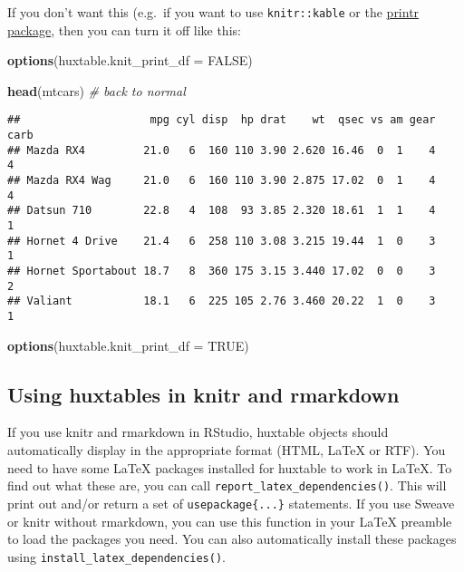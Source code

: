 \documentclass[]{article}
\newenvironment{Shaded}{\begin{snugshade}}{\end{snugshade}}
\newcommand{\CommentTok}[1]{\textcolor[rgb]{0.56,0.35,0.01}{\textit{#1}}}
\newcommand{\DataTypeTok}[1]{\textcolor[rgb]{0.13,0.29,0.53}{#1}}
\newcommand{\KeywordTok}[1]{\textcolor[rgb]{0.13,0.29,0.53}{\textbf{#1}}}
\newcommand{\NormalTok}[1]{#1}
\newcommand{\OtherTok}[1]{\textcolor[rgb]{0.56,0.35,0.01}{#1}}
\begin{document}
\FloatBarrier

If you don't want this (e.g.~if you want to use \texttt{knitr::kable} or
the
\href{https://cran.r-project.org/package=printr/vignettes/printr.html}{printr
package}, then you can turn it off like this:

\begin{Shaded}
\begin{Highlighting}[]
\KeywordTok{options}\NormalTok{(}\DataTypeTok{huxtable.knit_print_df =} \OtherTok{FALSE}\NormalTok{)}

\KeywordTok{head}\NormalTok{(mtcars) }\CommentTok{# back to normal}
\end{Highlighting}
\end{Shaded}

\begin{verbatim}
##                    mpg cyl disp  hp drat    wt  qsec vs am gear carb
## Mazda RX4         21.0   6  160 110 3.90 2.620 16.46  0  1    4    4
## Mazda RX4 Wag     21.0   6  160 110 3.90 2.875 17.02  0  1    4    4
## Datsun 710        22.8   4  108  93 3.85 2.320 18.61  1  1    4    1
## Hornet 4 Drive    21.4   6  258 110 3.08 3.215 19.44  1  0    3    1
## Hornet Sportabout 18.7   8  360 175 3.15 3.440 17.02  0  0    3    2
## Valiant           18.1   6  225 105 2.76 3.460 20.22  1  0    3    1
\end{verbatim}

\begin{Shaded}
\begin{Highlighting}[]
\KeywordTok{options}\NormalTok{(}\DataTypeTok{huxtable.knit_print_df =} \OtherTok{TRUE}\NormalTok{)}
\end{Highlighting}
\end{Shaded}

\FloatBarrier

\hypertarget{using-huxtables-in-knitr-and-rmarkdown}{%
\subsection{Using huxtables in knitr and
rmarkdown}\label{using-huxtables-in-knitr-and-rmarkdown}}

If you use knitr and rmarkdown in RStudio, huxtable objects should
automatically display in the appropriate format (HTML, LaTeX or RTF).
You need to have some LaTeX packages installed for huxtable to work in
LaTeX. To find out what these are, you can call
\texttt{report\_latex\_dependencies()}. This will print out and/or
return a set of \texttt{usepackage\{...\}} statements. If you use Sweave
or knitr without rmarkdown, you can use this function in your LaTeX
preamble to load the packages you need. You can also automatically
install these packages using \texttt{install\_latex\_dependencies()}.
\end{document}
